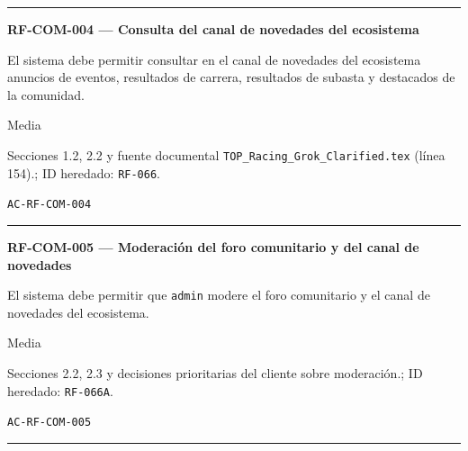 \documentclass[10pt,letterpaper]{article}
\begin{document}
\vspace{0.25em}\hrule\vspace{0.65em}
\noindent\textbf{RF-COM-004 --- Consulta del canal de novedades del ecosistema}\par
\begin{description}[style=nextline,leftmargin=3.15cm,labelwidth=2.8cm,font=\normalfont\bfseries]
\item[Obligación] El sistema debe permitir consultar en el canal de novedades del ecosistema anuncios de eventos, resultados de carrera, resultados de subasta y destacados de la comunidad.
\item[Prioridad] Media
\item[Procedencia] Secciones 1.2, 2.2 y fuente documental \texttt{TOP\_Racing\_Grok\_Clarified.tex} (línea 154).; ID heredado: \texttt{RF-066}.
\item[Verificación] \texttt{AC-RF-COM-004}
\end{description}
\vspace{0.25em}\hrule\vspace{0.65em}
\noindent\textbf{RF-COM-005 --- Moderación del foro comunitario y del canal de novedades}\par
\begin{description}[style=nextline,leftmargin=3.15cm,labelwidth=2.8cm,font=\normalfont\bfseries]
\item[Obligación] El sistema debe permitir que \texttt{admin} modere el foro comunitario y el canal de novedades del ecosistema.
\item[Prioridad] Media
\item[Procedencia] Secciones 2.2, 2.3 y decisiones prioritarias del cliente sobre moderación.; ID heredado: \texttt{RF-066A}.
\item[Verificación] \texttt{AC-RF-COM-005}
\end{description}
\vspace{0.25em}\hrule\vspace{0.65em}
\end{document}
